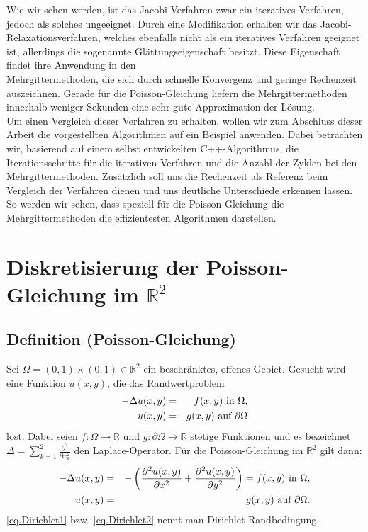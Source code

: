 Wie wir sehen werden, ist das Jacobi-Verfahren zwar ein iteratives Verfahren, jedoch als solches ungeeignet. Durch eine Modifikation erhalten wir das Jacobi-Relaxationsverfahren, welches ebenfalls nicht als ein iteratives Verfahren geeignet ist, allerdings die sogenannte Glättungseigenschaft besitzt. Diese Eigenschaft findet ihre Anwendung in den\\ Mehrgittermethoden, die sich durch schnelle Konvergenz und geringe Rechenzeit auszeichnen. Gerade für die Poisson-Gleichung liefern die Mehrgittermethoden innerhalb weniger Sekunden eine sehr gute Approximation der Lösung.\\
Um einen Vergleich dieser Verfahren zu erhalten, wollen wir zum Abschluss dieser Arbeit die vorgestellten Algorithmen auf ein Beispiel anwenden. Dabei betrachten wir, basierend auf einem selbst entwickelten C++-Algorithmus, die Iterationsschritte für die iterativen Verfahren und die Anzahl der Zyklen bei den Mehrgittermethoden. Zusätzlich soll uns die Rechenzeit als Referenz beim Vergleich der Verfahren dienen und uns deutliche Unterschiede erkennen lassen. So werden wir sehen, dass speziell für die Poisson Gleichung die Mehrgittermethoden die effizientesten Algorithmen darstellen.


\chapter{Diskretisierung der Poisson-Gleichung im $\mathbb{R}^{2}$} \label{c.Diskretisierte Poisson-Gleichung}

\section{Definition (Poisson-Gleichung)}\label{s.Poisson-Gleichung}

Sei $\Omega = (0,1)\times(0,1) \in \mathbb{R}^{2}$ ein beschränktes, offenes Gebiet. Gesucht wird eine Funktion $u(x,y)$, die das Randwertproblem
\begin{eqnarray}
-\Delta u(x,y) &=& f(x,y) \textnormal{ in } \Omega, \\
u(x,y) &=& g(x,y) \textnormal{ auf } \partial \Omega\label{eq.Dirichlet1}
\end{eqnarray}
löst.
Dabei seien $f: \Omega \rightarrow \mathbb{R}$ und $g: \partial\Omega \rightarrow \mathbb{R}$ stetige Funktionen und es bezeichnet \\$\Delta = \sum\limits_{k=1}^{2} \frac {\partial^{2}} {\partial x_{k}^{2}}$ den Laplace-Operator. Für die Poisson-Gleichung im $\mathbb{R}^{2}$ gilt dann:
\begin{eqnarray}
-\Delta u(x,y) &=& - \left( \frac {\partial^{2} u(x,y)} {\partial x^{2}} + \frac {\partial^{2} u(x,y)} {\partial y^{2}} \right) = f(x,y) \textnormal{ in } \Omega, \\
u(x,y) &=& g(x,y) \textnormal{ auf } \partial \Omega.\label{eq.Dirichlet2}
\end{eqnarray}
\autoref{eq.Dirichlet1} bzw. \autoref{eq.Dirichlet2} nennt man Dirichlet-Randbedingung.\\

